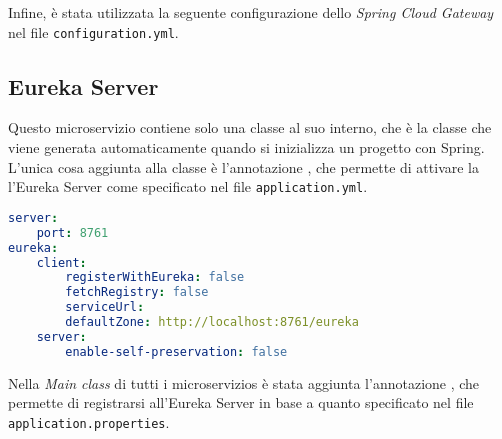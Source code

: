 

\noindent Infine, è stata utilizzata la seguente configurazione dello
\textit{Spring Cloud Gateway} nel file \texttt{configuration.yml}.




\subsection{Eureka Server}
Questo \gls{microservizio} contiene solo una classe al suo interno, che è la
classe che viene generata automaticamente quando si inizializza un progetto con
Spring. L'unica cosa aggiunta alla classe è l'annotazione
, che permette di  attivare la l'\gls{Eureka Server}
come specificato nel file \texttt{application.yml}.

\begin{lstlisting}[language = yaml, caption = {File \texttt{application.yml} del microservizio \texttt{Eureka Server}}]
server:
    port: 8761
eureka:
    client:
        registerWithEureka: false 
        fetchRegistry: false
        serviceUrl:
        defaultZone: http://localhost:8761/eureka
    server:
        enable-self-preservation: false
\end{lstlisting}
\noindent Nella \textit{Main class} di tutti i \glspl{microservizio}  è stata
aggiunta l'annotazione , che permette di registrarsi
all'\gls{Eureka Server} in base a quanto specificato nel file
\texttt{application.properties}.\\

